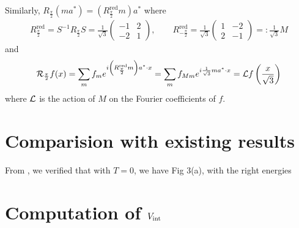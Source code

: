 \documentclass[11pt,a4paper,reqno,french,tikz]{amsart}
\newcommand{\pa}[1]{\left( #1 \right)} %
\newcommand{\f}[2]{\frac{#1}{#2}} %
\newcommand{\ind}[1]{_{\textup{#1}}} %
\newcommand{\mat}[1]{\begin{pmatrix} #1 \end{pmatrix}} %
\begin{document}
Similarly, $R_{\f{\pi}2}  \pa{ma^* } = \pa{R_{\f{\pi}2}^{\text{red}} m} a^*$ where
\begin{align*}
	R_{\f{\pi}2} ^{\text{red}} = S^{-1} R_{\f{\pi}2}  S = \f{1}{\sqrt 3} \mat{-1 & 2 \\ -2 & 1}, \qquad R_{-\f{\pi}2}^{\text{red}} = \f{1}{\sqrt 3} \mat{1 & -2 \\ 2 & -1} =: \f{1}{\sqrt 3} M
\end{align*}
and
\begin{align*}
\cR_{\f{\pi}2} f(x) = \sum_m f_m e^{i \pa{R_{\f{\pi}2}^{\text{red}} m} a^* \cdot x} = \sum_m f_{M m} e^{i \f{1}{\sqrt 3} m a^* \cdot x} = \cL f\pa{\f{x}{\sqrt 3}}
\end{align*}
where $\mathcal{L}$ is the action of $M$ on the Fourier coefficients of $f$.

\section{Comparision with existing results}%
\label{sec:comparision_with_existing_results}

From \cite{FanCarZhu19}, we verified that with $T=0$, we have Fig 3(a), with the right energies



\section{Computation of $V\ind{int}$}%
\label{sec:computation_of_vint_}
\end{document}
